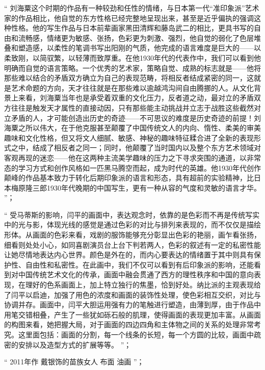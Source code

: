 \documentclass[master,oneside]{zjuthesis}
\begin{document}
“ 刘海粟这个时期的作品有一种较劲和任性的情绪，与日本第一代“准印象派”艺术家的作品相比，他自觉的东方性格已经完整地呈现出来，甚至是近乎偏执的强调这种性格。他的写生作品与日本前辈画家黑田清辉和藤岛武二的相比，更具书写的自由和流畅感，情绪更为敏感、张扬，色彩更为刺激、强烈，他自觉的弱化了色层堆叠和塑造感，以柔性的笔调书写出阳刚的气质，他完成的语言难度是巨大的——以柔致刚，以简驭繁，以轻薄而致厚重。在他1930年代的代表作中，我们可以看到他明确而自觉的语言策略。一个优秀的艺术家，策略自觉、成熟的标志就是——他将那些难以结合的矛盾双方确立为自己的表现范畴，将相反者结成紧密的同一，这就是艺术命题的方向，天才往往就是在那些难以逾越鸿沟间自由腾挪的人。从文化背景上来看，刘海粟当年也是承受着双重的文化压力，反者道之动，最对立的矛盾双方往往是触发天才属性的直接动因，只有那些能主动挑战并立志于战胜这些截然对立矛盾的人，才可能创造出历史的奇迹——不可思议的难度是历史奇迹的前提！刘海粟之所以伟大，在于他克服甚至颠覆了中国传统文人的内向、惰性、柔美的审美趣味和文化性格，但又将文人细腻、敏感、神秘的趣味特征糅合进了全新的表现形式之中，结成了相反者之同一；同时，他颠覆了当时国内以及整个东方艺术领域对客观再现的迷恋——他在这两种主流美学趣味的压力之下寻求突围的通道，以非常态的学习方式和创作风格如一匹黑马腾空而起，成为时代的英雄。他1930年代创作颠峰的作品基本致力于转化后期印象派的语言和形态，具有超前的实验精神，比日本梅原隆三郎1930年代晚期的中国写生，更有一种从容的气度和灵敏的语言才华。 ”；

“ 受马蒂斯的影响，闫平的画面中，表达观念时，依靠的是色彩而不再是传统写实中的光与影，体现光线的感觉是通过色彩的对比与排列来表现的，而不仅仅是描绘形体。从画面的色彩来看，戏剧的服饰能够充分彰显出色彩的艳丽，画乍看张扬，细看则处处小心，如同喜剧演员台上台下判若两人，色彩的叙述有一定的私密性能让她尽情地表达内心世界。颜色是外在的，而内心要表达的情绪置于其中则具有保护性、自由性和私密性。在此画中，我们不仅可以看到有后印象派的影响，还能看到对中国传统艺术文化的传承，画面中融会贯通了西方的理性秩序和中国的意向表现，在理好的色系画面上，加上特立独行的焦墨，恰到好处。纳比派的主观表现给了闫平以启迪，加强了用色的浓度和画面的装饰性处理，使色彩相互交织，对比与协调并存。画面中，闫平大胆运用强有力的笔触进行塑造，由薄到厚，由于作品中用笔交错相叠，产生了一些犹如砾石般的肌理，使得画面的表现更加丰富。从画面的构图来看，她把握大局，对于画面的四边四角和主体物之间的关系的处理非常考究。这里面包括：画面的分割，每一个线条的长短，每一个方圆的比较，画面中疏密的安排以及造型方式的扩展等等。 ”；

“ 2011年作 戴银饰的苗族女人 布面 油画 ”；
\end{document}
